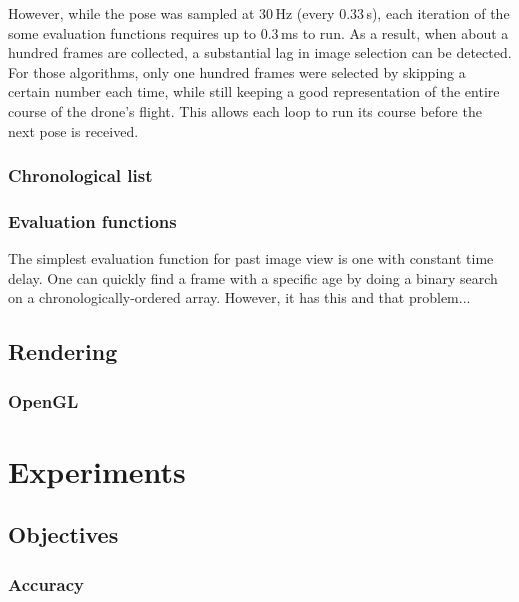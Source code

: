   However, while the pose was sampled at 30\,Hz (every 0.33\,s), each iteration of the some evaluation functions requires up to 0.3\,ms to run.
  As a result, when about a hundred frames are collected, a substantial lag in image selection can be detected.
  For those algorithms, only one hundred frames were selected by skipping a certain number each time, while still keeping a good representation of the entire course of the drone's flight.
  This allows each loop to run its course before the next pose is received.

  \subsection{Chronological list}

  \subsection{Evaluation functions}
    The simplest evaluation function for past image view is one with constant time delay.
    One can quickly find a frame with a specific age by doing a binary search on a chronologically-ordered array.
    However, it has this and that problem...


\section{Rendering}
  \subsection{OpenGL}

\chapter{Experiments}
\label{ch:experiments}
\section{Objectives}
  \subsection{Accuracy}
